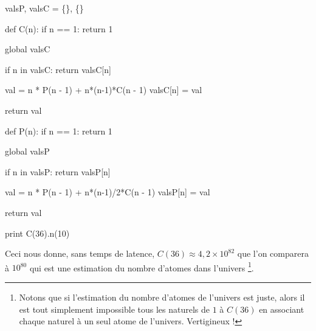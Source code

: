 \bigskip

\begin{myverb}
valsP, valsC = \{\}, \{\}


def C(n):
    if n == 1:
        return 1

    global valsC

    if n in valsC:
        return valsC[n]

    val      = n * P(n - 1) + n*(n-1)*C(n - 1)
    valsC[n] = val

    return val


def P(n):
    if n == 1:
        return 1

    global valsP

    if n in valsP:
        return valsP[n]

    val      = n * P(n - 1) + n*(n-1)/2*C(n - 1)
    valsP[n] = val

    return val


print C(36).n(10)

\end{myverb}

\bigskip

Ceci nous donne, sans temps de latence, $C(36) \approx 4,\!2 \times 10^{82}$ que l'on comparera à $10^{80}$ qui est une estimation du nombre d'atomes dans l'univers
\footnote{
    Notons que si l'estimation du nombre d'atomes de l'univers est juste, alors il est tout simplement impossible  tous les naturels de $1$ à $C(36)$ en associant chaque naturel à un seul atome de l'univers. Vertigineux !
}.
